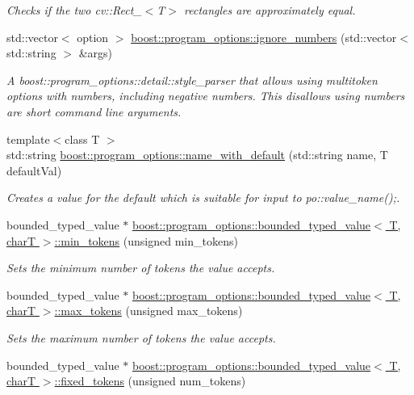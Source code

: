 \begin{DoxyCompactItemize}
\begin{DoxyCompactList}\small\item\em Checks if the two cv\+::\+Rect\+\_\+$<$\+T$>$ rectangles are approximately equal. \end{DoxyCompactList}\item 
std\+::vector$<$ option $>$ \hyperlink{group___utility_module_ga3db1b0bae61386198482fae1645b959d}{boost\+::program\+\_\+options\+::ignore\+\_\+numbers} (std\+::vector$<$ std\+::string $>$ \&args)
\begin{DoxyCompactList}\small\item\em A boost\+::program\+\_\+options\+::detail\+::style\+\_\+parser that allows using multitoken options with numbers, including negative numbers. This disallows using numbers are short command line arguments. \end{DoxyCompactList}\item 
{\footnotesize template$<$class T $>$ }\\std\+::string \hyperlink{group___utility_module_ga8b756cf9f42d2452f48d168883c76f4f}{boost\+::program\+\_\+options\+::name\+\_\+with\+\_\+default} (std\+::string name, T default\+Val)
\begin{DoxyCompactList}\small\item\em Creates a value for the default which is suitable for input to po\+::value\+\_\+name();. \end{DoxyCompactList}\item 
bounded\+\_\+typed\+\_\+value $\ast$ \hyperlink{group___utility_module_ga92bfc58add0451fb2f594e7b78ff966c}{boost\+::program\+\_\+options\+::bounded\+\_\+typed\+\_\+value$<$ T, char\+T $>$\+::min\+\_\+tokens} (unsigned min\+\_\+tokens)
\begin{DoxyCompactList}\small\item\em Sets the minimum number of tokens the value accepts. \end{DoxyCompactList}\item 
bounded\+\_\+typed\+\_\+value $\ast$ \hyperlink{group___utility_module_ga88b81b9c4d7c1f667594d6e1490078ff}{boost\+::program\+\_\+options\+::bounded\+\_\+typed\+\_\+value$<$ T, char\+T $>$\+::max\+\_\+tokens} (unsigned max\+\_\+tokens)
\begin{DoxyCompactList}\small\item\em Sets the maximum number of tokens the value accepts. \end{DoxyCompactList}\item 
bounded\+\_\+typed\+\_\+value $\ast$ \hyperlink{group___utility_module_ga1a9caf446ce6f236f70dfd6a54885478}{boost\+::program\+\_\+options\+::bounded\+\_\+typed\+\_\+value$<$ T, char\+T $>$\+::fixed\+\_\+tokens} (unsigned num\+\_\+tokens)

\end{DoxyCompactItemize}
